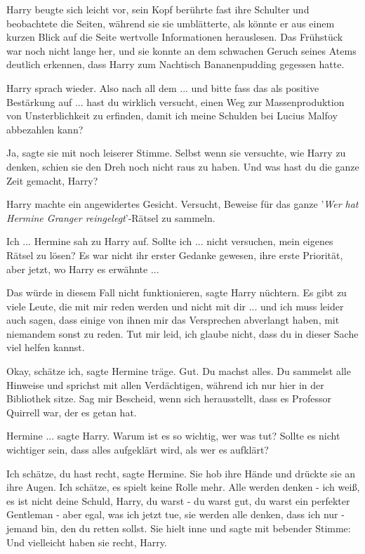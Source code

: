 Harry beugte sich leicht vor, sein Kopf berührte fast ihre Schulter und
beobachtete die Seiten, während sie sie umblätterte, als könnte er aus einem
kurzen Blick auf die Seite wertvolle Informationen herauslesen. Das Frühstück
war noch nicht lange her, und sie konnte an dem schwachen Geruch seines Atems
deutlich erkennen, dass Harry zum Nachtisch Bananenpudding gegessen hatte.

Harry sprach wieder. \glqq{}Also nach all dem ... und bitte fass das als positive
Bestärkung auf ... hast du wirklich versucht, einen Weg zur Massenproduktion von
Unsterblichkeit zu erfinden, damit ich meine Schulden bei Lucius Malfoy
abbezahlen kann?\grqq{}

\glqq{}Ja\grqq{}, sagte sie mit noch leiserer Stimme. Selbst wenn sie versuchte,
wie Harry zu denken, schien sie den Dreh noch nicht raus zu haben. \glqq{}Und was
hast du die ganze Zeit gemacht, Harry?\grqq{}

Harry machte ein angewidertes Gesicht. \glqq{}Versucht, Beweise für das ganze
'\emph{Wer hat Hermine Granger reingelegt}'-Rätsel zu sammeln.\grqq{}

\glqq{}Ich ...\grqq{} Hermine sah zu Harry auf. \glqq{}Sollte ich ... nicht
versuchen, mein eigenes Rätsel zu lösen?\grqq{} Es war nicht ihr erster Gedanke
gewesen, ihre erste Priorität, aber jetzt, wo Harry es erwähnte ...

\glqq{}Das würde in diesem Fall nicht funktionieren\grqq{}, sagte Harry nüchtern.
\glqq{}Es gibt zu viele Leute, die mit mir reden werden und nicht mit dir ... und
ich muss leider auch sagen, dass einige von ihnen mir das Versprechen abverlangt
haben, mit niemandem sonst zu reden. Tut mir leid, ich glaube nicht, dass du in
dieser Sache viel helfen kannst.\grqq{}

\glqq{}Okay, schätze ich\grqq{}, sagte Hermine träge. \glqq{}Gut. Du machst alles.
Du sammelst alle Hinweise und sprichst mit allen Verdächtigen, während ich nur
hier in der Bibliothek sitze. Sag mir Bescheid, wenn sich herausstellt, dass es
Professor Quirrell war, der es getan hat.\grqq{}

\glqq{}Hermine ...\grqq{} sagte Harry. \glqq{}Warum ist es so wichtig, wer was tut?
Sollte es nicht wichtiger sein, dass alles aufgeklärt wird, als wer es
aufklärt?\grqq{}

\glqq{}Ich schätze, du hast recht\grqq{}, sagte Hermine. Sie hob ihre Hände und
drückte sie an ihre Augen. \glqq{}Ich schätze, es spielt keine Rolle mehr. Alle
werden denken - ich weiß, es ist nicht deine Schuld, Harry, du warst - du warst
gut, du warst ein perfekter Gentleman - aber egal, was ich jetzt tue, sie werden
alle denken, dass ich nur - jemand bin, den du retten sollst.\grqq{} Sie hielt
inne und sagte mit bebender Stimme: \glqq{}Und vielleicht haben sie recht,
Harry.\grqq{}

